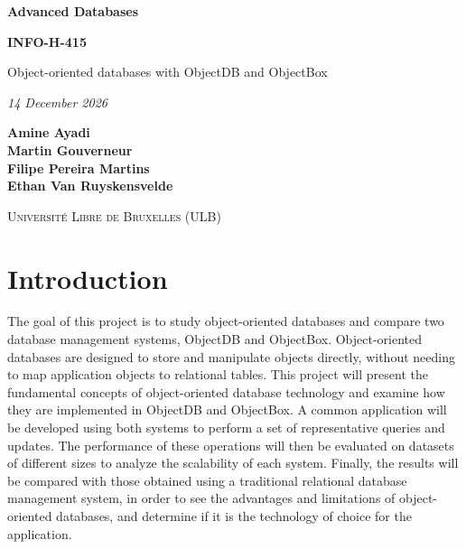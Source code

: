 \documentclass{article}
\begin{document}
\begin{titlepage}
    \begin{center}
        \vspace*{2cm}

        \Huge
        \textbf{Advanced Databases}
        \vspace{0.25cm}

        \LARGE
        \textbf{INFO-H-415}

        \vspace{0.25cm}
        \LARGE
        Object-oriented databases with ObjectDB and ObjectBox

        \vspace{0.25cm}
        \textit{14 December 2026}

        \vspace{2cm}
        \Large
        \textbf{Amine Ayadi}\\
        \textbf{Martin Gouverneur}\\
        \textbf{Filipe Pereira Martins}\\
        \textbf{Ethan Van Ruyskensvelde}\\

        \vspace{2cm}

        \textsc{Université Libre de Bruxelles (ULB)}

    \end{center}
\end{titlepage}

\tableofcontents
\newpage

\section{Introduction}
The goal of this project is to study object-oriented databases and compare two database management systems, ObjectDB and ObjectBox. Object-oriented databases are designed to store and manipulate objects directly, without needing to map application objects to relational tables. This project will present the fundamental concepts of object-oriented database technology and examine how they are implemented in ObjectDB and ObjectBox. A common application will be developed using both systems to perform a set of representative queries and updates. The performance of these operations will then be evaluated on datasets of different sizes to analyze the scalability of each system. Finally, the results will be compared with those obtained using a traditional relational database management system, in order to see the advantages and limitations of object-oriented databases, and determine if it is the technology of choice for the application.
\end{document}
